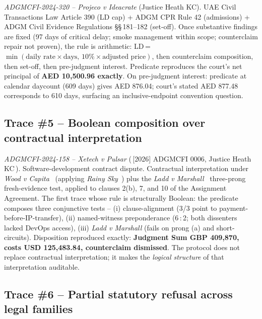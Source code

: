 \documentclass[11pt,letterpaper]{article}
\begin{document}
\textit{ADGMCFI-2024-320 -- Projeco v Ideacrate} (Justice Heath KC). UAE Civil Transactions Law Article 390 (LD cap) + ADGM CPR Rule 42 (admissions) + ADGM Civil Evidence Regulations §§\,181--182 (set-off). Once substantive findings are fixed (97 days of critical delay; smoke management within scope; counterclaim repair not proven), the rule is arithmetic: LD\,=\,$\min(\text{daily rate}\times\text{days},\,10\%\times\text{adjusted price})$, then counterclaim composition, then set-off, then pre-judgment interest. Predicate reproduces the court's net principal of \textbf{AED 10{,}500.96 exactly}. On pre-judgment interest: predicate at calendar daycount (609 days) gives AED 876.04; court's stated AED 877.48 corresponds to 610 days, surfacing an inclusive-endpoint convention question.

\subsection{Trace \#5 -- Boolean composition over contractual interpretation}

\textit{ADGMCFI-2024-158 -- Xetech v Pulsar} (\,[2026] ADGMCFI 0006, Justice Heath KC\,). Software-development contract dispute. Contractual interpretation under \textit{Wood v Capita}~\cite{wood} (applying \textit{Rainy Sky}~\cite{rainysky}) plus the \textit{Ladd v Marshall}~\cite{ladd} three-prong fresh-evidence test, applied to clauses 2(b), 7, and 10 of the Assignment Agreement. The first trace whose rule is structurally Boolean: the predicate composes three conjunctive tests -- (i) clause-alignment (3/3 point to payment-before-IP-transfer), (ii) named-witness preponderance (6\,:\,2; both dissenters lacked DevOps access), (iii) \textit{Ladd v Marshall} (fails on prong (a) and short-circuits). Disposition reproduced exactly: \textbf{Judgment Sum GBP 409{,}870, costs USD 125{,}483.84, counterclaim dismissed}. The protocol does not replace contractual interpretation; it makes the \textit{logical structure} of that interpretation auditable.

\subsection{Trace \#6 -- Partial statutory refusal across legal families}
\end{document}
